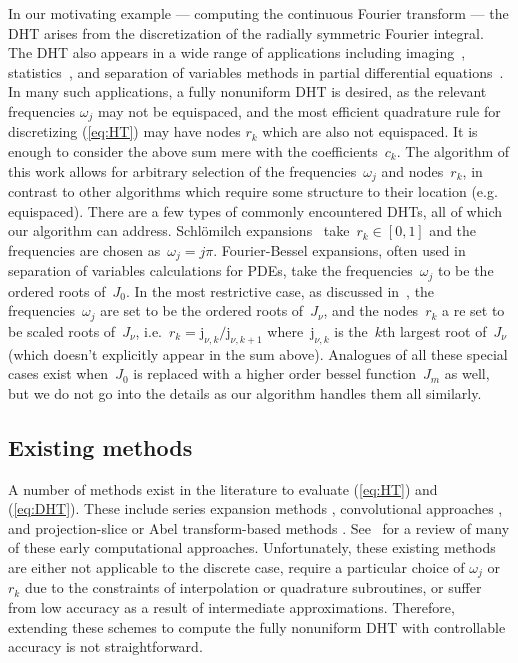 In our motivating example --- computing the continuous Fourier transform --- the
DHT arises from the discretization of the radially symmetric Fourier integral.
The DHT also appears in a wide range of applications including
imaging~\cite{higgins1988hankel, zhao2013fourier, marshall2023fast},
statistics~\cite{lord1954a, genton2002nonparametric}, and separation of
variables methods in partial differential
equations~\cite{bisseling1985fast,ali1999generalized, zhou2022spectral}. In many
such applications, a fully nonuniform DHT is desired, as the relevant
frequencies $\omega_j$ may not be equispaced, and the most efficient quadrature
rule for discretizing (\ref{eq:HT}) may have nodes $r_k$ which are also not
equispaced. It is enough to consider the above sum mere with the
coefficients~$c_k$. The algorithm of this work allows for arbitrary selection of
the frequencies~$\omega_j$ and nodes~$r_k$, in contrast to other algorithms
which require some structure to their location (e.g. equispaced). There are a
few types of commonly encountered DHTs, all of which our algorithm can address.
Schl\"omilch expansions~\cite{} take~$r_k \in [0,1]$ and the frequencies are
chosen as~$\omega_j = j\pi$. Fourier-Bessel expansions, often used in separation
of variables calculations for PDEs, take the frequencies~$\omega_j$ to be the
ordered roots of~$J_0$. In the most restrictive case, as discussed
in~\cite{johnson1987}, the frequencies~$\omega_j$ are set to be the ordered
roots of~$J_\nu$, and the nodes~$r_k$ a re set to be scaled roots of~$J_\nu$,
i.e.~$r_k = \mathrm{j}_{\nu,k}/\mathrm{j}_{\nu,k+1}$ where~$\mathrm{j}_{\nu,k}$
is the~$k$th largest root of~$J_\nu$ (which doesn't explicitly appear in the sum
above). Analogues of all these special cases exist when~$J_0$ is replaced with a
higher order bessel function~$J_m$ as well, but we do not go into the details as
our algorithm handles them all similarly.

\subsection*{Existing methods}
\label{sec:existing}

A number of methods exist in the literature to evaluate (\ref{eq:HT}) and
(\ref{eq:DHT}). These include series expansion methods
\cite{lord1954b,brunol1977fourier,cavanagh1979numerical}, convolutional
approaches \cite{siegman1977quasi, johansen1979fast, mook1983algorithm}, and
projection-slice or Abel transform-based methods \cite{oppenheim1980computation,
hansen1985fast, kapur1995algorithm}. See~\cite{cree1993algorithms} for a review
of many of these early computational approaches. Unfortunately, these existing
methods are either not applicable to the discrete case, require a particular
choice of $\omega_j$ or $r_k$ due to the constraints of interpolation or
quadrature subroutines, or suffer from low accuracy as a result of intermediate
approximations. Therefore, extending these schemes to compute the fully
nonuniform DHT with controllable accuracy is not straightforward.

